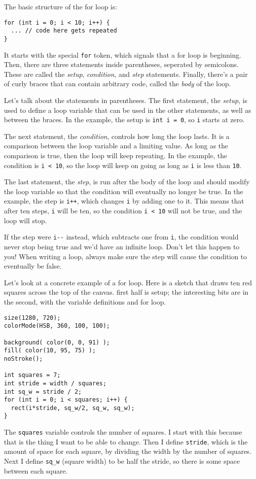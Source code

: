 \documentclass[
]{leaflet}
\begin{document}
The basic structure of the for loop is:
\begin{lstlisting}
for (int i = 0; i < 10; i++) {
  ... // code here gets repeated
}
\end{lstlisting}
It starts with the special \texttt{for} token, which signals that a for loop is beginning.
Then, there are three statements inside parentheses, seperated by semicolons.
These are called the \textit{setup}, \textit{condition}, and \textit{step} statements.
Finally, there's a pair of curly braces that can contain arbitrary code, called the \textit{body} of the loop.

Let's talk about the statements in parentheses.
The first statement, the \textit{setup}, is used to define a loop variable that can be used in the other statements, as well as between the braces.
In the example, the setup is \texttt{int i = 0}, so \texttt{i} starts at zero.

The next statement, the \textit{condition}, controls how long the loop lasts.
It is a comparison between the loop variable and a limiting value.
As long as the comparison is true, then the loop will keep repeating.
In the example, the condition is \texttt{i < 10}, so the loop will keep on going as long as \texttt{i} is less than \texttt{10}.

The last statement, the \textit{step}, is run after the body of the loop and should modify the loop variable so that the condition will eventually no longer be true.
In the example, the step is \texttt{i++}, which changes \texttt{i} by adding one to it.
This means that after ten steps, \texttt{i} will be ten, so the condition \texttt{i < 10} will not be true, and the loop will stop.

If the step were \texttt{i-}\texttt{-} instead, which subtracts one from \texttt{i}, the condition would never stop being true and we'd have an infinite loop.
Don't let this happen to you!
When writing a loop, always make sure the step will cause the condition to eventually be false.

Let's look at a concrete example of a for loop.
Here is a sketch that draws ten red squares across the top of the canvas.
 first half is setup; the interesting bits are in the second, with the variable definitions and for loop.
\begin{lstlisting}
size(1280, 720);
colorMode(HSB, 360, 100, 100);

background( color(0, 0, 91) );
fill( color(10, 95, 75) );
noStroke();

int squares = 7;
int stride = width / squares;
int sq_w = stride / 2;
for (int i = 0; i < squares; i++) {
  rect(i*stride, sq_w/2, sq_w, sq_w);
}
\end{lstlisting}
The \texttt{squares} variable controls the number of squares.
I start with this because that is the thing I want to be able to change.
Then I define \texttt{stride}, which is the amount of space for each square, by dividing the width by the number of squares.
Next I define \texttt{sq\_w} (square width) to be half the stride, so there is some space between each square.
\end{document}
